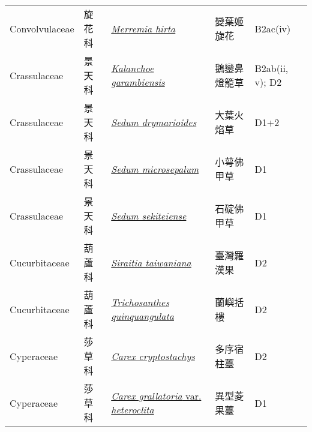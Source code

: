 {\begin{longtable}{L{2.5cm}L{2cm}L{5cm}L{2.5cm}L{3cm}}
    Convolvulaceae & 旋花科 & \href{http://www.theplantlist.org/tpl1.1/search?q=Merremia+hirta}{\textit{Merremia hirta} } & 變葉姬旋花 & B2ac(iv)    \\
    Crassulaceae & 景天科 & \href{http://www.theplantlist.org/tpl1.1/search?q=Kalanchoe+garambiensis}{\textit{Kalanchoe garambiensis} } & 鵝鑾鼻燈籠草 & B2ab(ii, v); D2    \\
    Crassulaceae & 景天科 & \href{http://www.theplantlist.org/tpl1.1/search?q=Sedum+drymarioides}{\textit{Sedum drymarioides} } & 大葉火焰草 & D1+2    \\
    Crassulaceae & 景天科 & \href{http://www.theplantlist.org/tpl1.1/search?q=Sedum+microsepalum}{\textit{Sedum microsepalum} } & 小萼佛甲草 & D1    \\
    Crassulaceae & 景天科 & \href{http://www.theplantlist.org/tpl1.1/search?q=Sedum+sekiteiense}{\textit{Sedum sekiteiense} } & 石碇佛甲草 & D1    \\
    Cucurbitaceae & 葫蘆科 & \href{http://www.theplantlist.org/tpl1.1/search?q=Siraitia+taiwaniana}{\textit{Siraitia taiwaniana} } & 臺灣羅漢果 & D2    \\
    Cucurbitaceae & 葫蘆科 & \href{http://www.theplantlist.org/tpl1.1/search?q=Trichosanthes+quinquangulata}{\textit{Trichosanthes quinquangulata} } & 蘭嶼括樓 & D2    \\
    Cyperaceae & 莎草科 & \href{http://www.theplantlist.org/tpl1.1/search?q=Carex+cryptostachys}{\textit{Carex cryptostachys} } & 多序宿柱薹 & D2    \\
    Cyperaceae & 莎草科 & \href{http://www.theplantlist.org/tpl1.1/search?q=Carex+grallatoria+var.+heteroclita}{\textit{Carex grallatoria} var. \textit{heteroclita} } & 異型菱果薹 & D1    \\

\end{longtable}}
